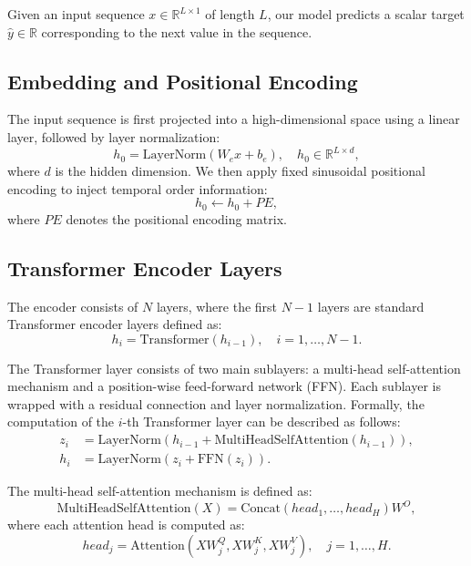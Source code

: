 \documentclass[conference]{IEEEtran}
\begin{document}
Given an input sequence $x \in \mathbb{R}^{L \times 1}$ of length $L$, our model predicts a scalar target $\hat{y} \in \mathbb{R}$ corresponding to the next value in the sequence.

\subsection{Embedding and Positional Encoding}

The input sequence is first projected into a high-dimensional space using a linear layer, followed by layer normalization:
\begin{equation}
h_0 = \text{LayerNorm}(W_e x + b_e), \quad h_0 \in \mathbb{R}^{L \times d},
\end{equation}
where $d$ is the hidden dimension. We then apply fixed sinusoidal positional encoding to inject temporal order information:
\begin{equation}
h_0 \leftarrow h_0 + PE,
\end{equation}
where $PE$ denotes the positional encoding matrix.

\subsection{Transformer Encoder Layers}

The encoder consists of $N$ layers, where the first $N-1$ layers are standard Transformer encoder layers defined as:
\begin{equation}
h_i = \text{Transformer}(h_{i-1}), \quad i = 1, \dots, N-1.
\end{equation}

The Transformer layer consists of two main sublayers: a multi-head self-attention mechanism and a position-wise feed-forward network (FFN). Each sublayer is wrapped with a residual connection and layer normalization. Formally, the computation of the $i$-th Transformer layer can be described as follows:
\begin{align}
z_i &= \text{LayerNorm}\left(h_{i-1} + \text{MultiHeadSelfAttention}(h_{i-1})\right), \\
h_i &= \text{LayerNorm}\left(z_i + \text{FFN}(z_i)\right).
\end{align}

The multi-head self-attention mechanism is defined as:
\begin{equation}
\text{MultiHeadSelfAttention}(X) = \text{Concat}(head_1, \dots, head_H)W^O,
\end{equation}
where each attention head is computed as:
\begin{equation}
head_j = \text{Attention}(XW_j^Q, XW_j^K, XW_j^V), \quad j = 1, \dots, H.
\end{equation}
\end{document}
